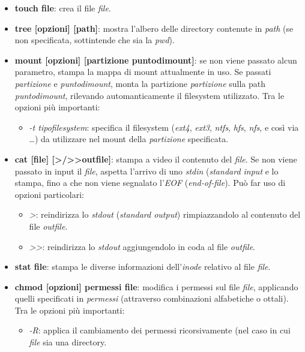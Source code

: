 \begin{itemize}
    \item \textbf{touch file}: crea il file \textit{file}.
    \item \textbf{tree [opzioni] [path]}: mostra l'albero delle directory contenute in \textit{path} (se non specificata, sottintende che sia la \textit{pwd}).
    \item \textbf{mount [opzioni] [partizione puntodimount]}: se non viene passato alcun parametro, stampa la mappa di mount attualmente in uso. Se passati \textit{partizione} e \textit{puntodimount}, monta la partizione \textit{partizione} sulla path \textit{puntodimount}, rilevando automanticamente il filesystem utilizzato. Tra le opzioni più importanti:
    \begin{itemize}
        \item \textit{-t tipofilesystem}: specifica il filesystem (\textit{ext4}, \textit{ext3}, \textit{ntfs}, \textit{hfs}, \textit{nfs}, e così via \ldots) da utilizzare nel mount della \textit{partizione} specificata.
    \end{itemize}
    \item \textbf{cat [file] [\textgreater/\textgreater\textgreater outfile]}: stampa a video il contenuto del \textit{file}. Se non viene passato in input il \textit{file}, aspetta l'arrivo di uno \textit{stdin} (\textit{standard input} e lo stampa, fino a che non viene segnalato l'\textit{EOF} (\textit{end-of-file}). Può far uso di opzioni particolari:
    \begin{itemize}
        \item \textit{\textgreater}: reindirizza lo \textit{stdout} (\textit{standard output}) rimpiazzandolo al contenuto del file \textit{outfile}.
        \item \textit{\textgreater\textgreater}: reindirizza lo \textit{stdout} aggiungendolo in coda al file \textit{outfile}.
    \end{itemize}
    \item \textbf{stat file}: stampa le diverse informazioni dell'\textit{inode} relativo al file \textit{file}.
    \item \textbf{chmod [opzioni] permessi file}: modifica i permessi sul file \textit{file}, applicando quelli specificati in \textit{permessi} (attraverso combinazioni alfabetiche o ottali). Tra le opzioni più importanti:
    \begin{itemize}
        \item \textit{-R}: applica il cambiamento dei permessi ricorsivamente (nel caso in cui \textit{file} sia una directory.
    \end{itemize}
\end{itemize}

